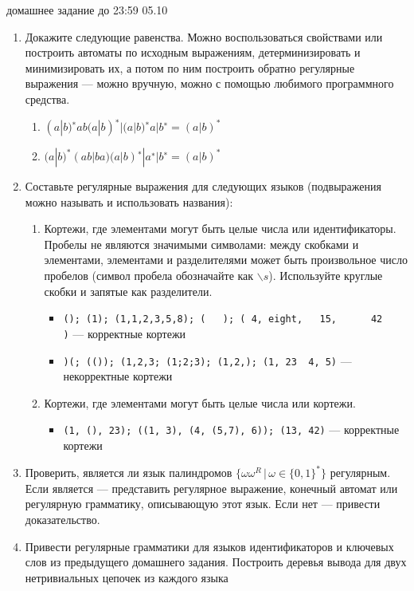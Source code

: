 \documentclass[12pt]{article}
\begin{document}

{\Large домашнее задание до 23:59 05.10}
\bigskip

\begin{enumerate}
  \item 
  { Докажите следующие равенства. Можно воспользоваться свойствами или построить автоматы по исходным выражениям, детерминизировать и минимизировать их, а потом по ним построить обратно регулярные выражения --- можно вручную, можно с помощью любимого программного средства.  
    \begin{enumerate} 
      \item { $ (a | b)^{∗} ab (a | b)^{∗} | (a | b)^{∗} a | b^{∗} = (a | b)^{*} $ }
      \item { $ (a | b)^{*} (ab | ba) (a | b)^{∗} | a^{∗} | b^{∗} = (a | b)^{*}$ }
    \end{enumerate}
  }
  
  \item
  { Составьте регулярные выражения для следующих языков (подвыражения можно называть и использовать названия): 
    \begin{enumerate}
      \item
      { Кортежи, где элементами могут быть целые числа или идентификаторы. Пробелы не являются значимыми символами: между скобками и элементами, элементами и разделителями может быть произвольное число пробелов (символ пробела обозначайте как $\backslash s$). Используйте круглые скобки и запятые как разделители. 
        \begin{itemize} 
          \item \verb!(); (1); (1,1,2,3,5,8); (   ); ( 4, eight,   15,      42     )! --- корректные кортежи
          \item \verb!)(; (()); (1,2,3; (1;2;3); (1,2,); (1, 23  4, 5)! --- некорректные кортежи
        \end{itemize}
      }
      \item
      { Кортежи, где элементами могут быть целые числа или кортежи. 
      \begin{itemize} 
          \item \verb!(1, (), 23); ((1, 3), (4, (5,7), 6)); (13, 42)! --- корректные кортежи
      \end{itemize}
      }
    \end{enumerate}
  }

  \item
  {
    Проверить, является ли язык палиндромов $\{ \omega \omega^R \, | \, \omega \in \{ 0, 1\}^*  \} $ регулярным. Если является --- представить регулярное выражение, конечный автомат или регулярную грамматику, описывающую этот язык. Если нет --- привести доказательство.
  }

  \item 
  {
    Привести регулярные грамматики для языков идентификаторов и ключевых слов из предыдущего домашнего задания. Построить деревья вывода для двух нетривиальных цепочек из каждого языка
  }
\end{enumerate}

\end{document}
